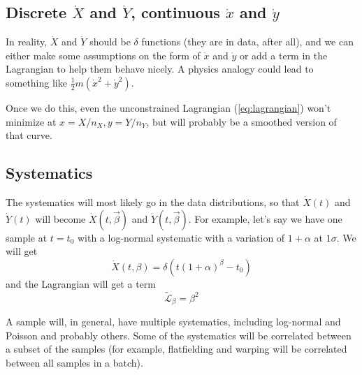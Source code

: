 \documentclass[11pt]{article}
\newcommand{\xdot}{\dot{x}}
\newcommand{\ydot}{\dot{y}}
\newcommand{\Xdot}{\dot{X}}
\newcommand{\Ydot}{\dot{Y}}
\begin{document}
\subsection{Discrete \texorpdfstring{\(\Xdot\)}{Xdot} and \texorpdfstring{\(\Ydot\)}{Ydot}, continuous \texorpdfstring{\(\xdot\)}{xdot} and \texorpdfstring{\(\ydot\)}{ydot}}
In reality, \(\Xdot\) and \(\Ydot\) should be \(\delta\) functions (they are in data, after all), and we can either make some assumptions on the form of \(\xdot\) and \(\ydot\) or add a term in the Lagrangian to help them behave nicely.  A physics analogy could lead to something like \(\frac{1}{2}m(\xdot^2+\ydot^2)\).

Once we do this, even the unconstrained Lagrangian (\cref{eq:lagrangian}) won't minimize at \(x=X/n_X, y=Y/n_Y\), but will probably be a smoothed version of that curve.

\subsection{Systematics}
\label{sec:systematics}

The systematics will most likely go in the data distributions, so that \(\Xdot(t)\) and \(\Ydot(t)\) will become \(\Xdot(t,\vec{\beta})\) and \(\Ydot(t,\vec{\beta})\).  For example, let's say we have one sample at \(t=t_0\) with a log-normal systematic with a variation of \(1+\alpha\) at \(1\sigma\).  We will get
\begin{equation}
\Xdot(t,\beta)=\delta(t(1+\alpha)^\beta-t_0)
\end{equation}
and the Lagrangian will get a term
\begin{equation}
\mathcal{\tilde{L}_\beta}=\beta^2
\end{equation}

A sample will, in general, have multiple systematics, including log-normal and Poisson and probably others.  Some of the systematics will be correlated between a subset of the samples (for example, flatfielding and warping will be correlated between all samples in a batch).

\printbibliography
\end{document}
